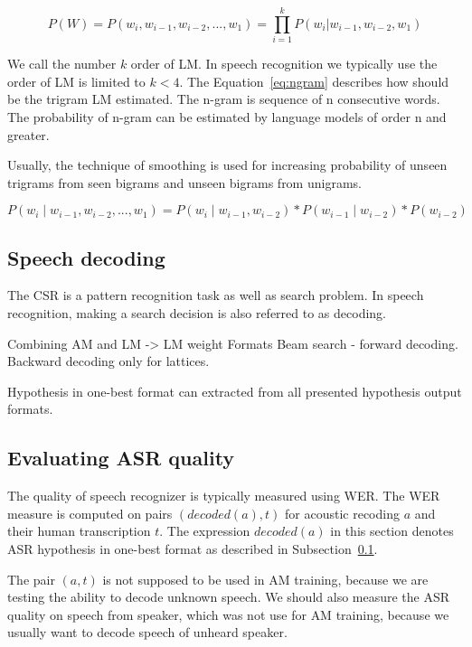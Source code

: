 {\begin{equation} \label{eq:lm}
    P(W)=P(w_i,  w_{i-1}, w_{i-2}, ..., w_1)=\prod_{i=1}^{k}{P(w_i|w_{i-1}, w_{i-2}, w_1)}
\end{equation}

We call the number $k$ order of \ac{LM}.
In speech recognition we typically use the order of \ac{LM} is limited to $k<4$.
The Equation~\ref{eq:ngram} describes how should be the trigram \ac{LM} estimated.
The n-gram is sequence of n consecutive words. The probability of n-gram can be estimated by language models
of order n and greater.

Usually, the technique of smoothing is used for increasing probability of unseen trigrams
from seen bigrams and unseen bigrams from unigrams.

\begin{equation} \label{eq:ngram}
    P(w_i \mid w_{i-1}, w_{i-2}, ..., w_1) = P(w_i \mid w_{i-1}, w_{i-2}) * P(w_{i-1} \mid w_{i-2}) * P(w_{i-2})
\end{equation}

\subsection{Speech decoding}
\label{sub:decode}
The \ac{CSR} is a pattern recognition task as well as search problem.
In speech recognition, making a search decision is also referred to as decoding.\cite{huang2001spoken}

Combining AM and LM -> LM weight
Formats
Beam search - forward decoding.
Backward decoding only for lattices.


Hypothesis in one-best format can extracted from all presented hypothesis output formats.

\subsection{Evaluating \ac{ASR} quality}
\label{sub:eval}
The quality of speech recognizer is typically measured using \acl{WER}.
The \ac{WER} measure is computed on pairs $(decoded(a),t)$ for acoustic recoding $a$ and their human transcription $t$.
The expression $decoded(a)$  in this section denotes \ac{ASR} hypothesis in one-best format 
as described in Subsection~\ref{sub:decode}.

The pair $(a,t)$ is not supposed to be used in \ac{AM} training,
because we are testing the ability to decode unknown speech.
We should also measure the \ac{ASR} quality on speech from speaker,
which was not use for \ac{AM} training, 
because we usually want to decode speech of unheard speaker.

}
